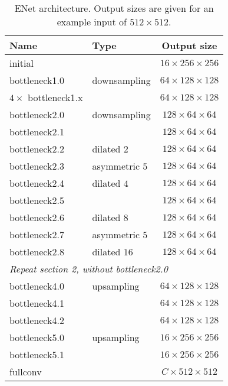 \documentclass{article}
\begin{document}
\begin{wraptable}{r}{2.75in}
  \footnotesize
  \caption{ENet architecture. Output sizes are given for an example input of $512 \times 512$.}
  \vspace{0.05in}
  \label{tab:structure}
  \centering
  \begin{tabular}{@{}l >{\centering}m{0.7in} c @{}}
    \toprule
    Name                & Type & Output size                  \\
    \midrule
    initial             &                   & $16 \times 256 \times 256$   \\
    \midrule
    bottleneck1.0       &  downsampling     & $64 \times 128 \times 128$   \\
    $4 \times$ bottleneck1.x  &                   & $64 \times 128 \times 128$   \\
    \midrule
    bottleneck2.0       &  downsampling     & $128 \times 64 \times 64$    \\
    bottleneck2.1       &                   & $128 \times 64 \times 64$    \\
    bottleneck2.2       &  dilated $2$      & $128 \times 64 \times 64$    \\
    bottleneck2.3       &  asymmetric $5$   & $128 \times 64 \times 64$    \\
    bottleneck2.4       &  dilated $4$      & $128 \times 64 \times 64$    \\
    bottleneck2.5       &                   & $128 \times 64 \times 64$    \\
    bottleneck2.6       &  dilated $8$      & $128 \times 64 \times 64$    \\
    bottleneck2.7       &  asymmetric $5$   & $128 \times 64 \times 64$    \\
    bottleneck2.8       &  dilated $16$     & $128 \times 64 \times 64$    \\
    \midrule
    \multicolumn{3}{l}{\textit{Repeat section 2, without bottleneck2.0}} \\
    \midrule
    bottleneck4.0       &  upsampling       & $64 \times 128 \times 128$    \\
    bottleneck4.1       &                   & $64 \times 128 \times 128$    \\
    bottleneck4.2       &                   & $64 \times 128 \times 128$    \\
    \midrule
    bottleneck5.0       &  upsampling       & $16 \times 256 \times 256$    \\
    bottleneck5.1       &                   & $16 \times 256 \times 256$    \\
    \midrule
    fullconv            &                   & $C  \times 512 \times 512$    \\
    \bottomrule
  \end{tabular}
  \vspace{-0.2in}
\end{wraptable}
\end{document}
